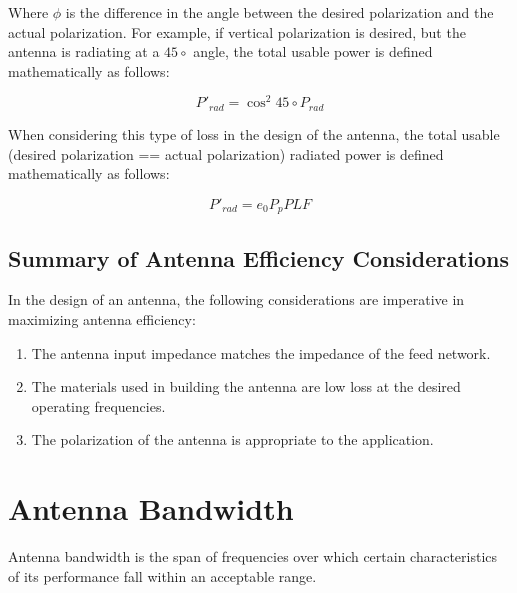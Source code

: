 \documentclass{article}
\begin{document}
Where $\phi$ is the difference in the angle between the desired polarization and the actual polarization. For example, if vertical polarization is desired, but the antenna is radiating at a $45\circ$ angle, the total usable power is defined mathematically as follows:

\begin{equation*}
    P'_{rad} = \cos^2{45\circ} P_{rad}
\end{equation*}

When considering this type of loss in the design of the antenna, the total usable (desired polarization == actual polarization) radiated power is defined mathematically as follows:

\begin{equation*}
    P'_{rad} = e_0 P_p PLF
\end{equation*}

\subsection{Summary of Antenna Efficiency Considerations}
In the design of an antenna, the following considerations are imperative in maximizing antenna efficiency:
    \begin{enumerate}
        \item The antenna input impedance matches the impedance of the feed network.
        \item The materials used in building the antenna are low loss at the desired operating frequencies.
        \item The polarization of the antenna is appropriate to the application.
    \end{enumerate}

\section{Antenna Bandwidth}
Antenna \gls{bandwidth} is the span of frequencies over which certain characteristics of its performance fall within an acceptable range.

\newpage
\clearpage
\printglossary
\printglossary[type=\acronymtype]
\end{document}
